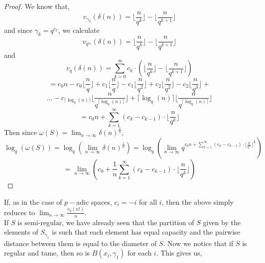 \begin{proof}
	We know that,
\[v_{\gamma_k}(\delta(n)) =  \lfloor\frac{n}{q^k}\rfloor - \lfloor\frac{n}{q^{k+1}}\rfloor \]
and since $\gamma_k = q^{c_k}$, we calculate
\[v_{q^{c_k}}(\delta(n)) =  \lfloor\frac{n}{q^k}\rfloor - \lfloor\frac{n}{q^{k+1}}\rfloor \]
and
\[v_{q}(\delta(n)) =  \sum_{k=0}^{\infty} c_k \cdot(\lfloor\frac{n}{q^k}\rfloor - \lfloor\frac{n}{q^{k+1}}\rfloor) \]
\[=  c_0n - c_0\lfloor\frac{n}{q}\rfloor + c_1\lfloor\frac{n}{q}\rfloor - c_1\lfloor\frac{n}{q^{2}}\rfloor  + c_2\lfloor\frac{n}{q^2}\rfloor - c_2\lfloor\frac{n}{q^{3}}\rfloor +\] \[\ldots - c_{\lceil \log_q(n) \rceil} \lfloor\frac{n}{q^{\lceil \log_q(n) \rceil}}\rfloor + \lceil \log_q(n) \rceil\lfloor\frac{n}{q^{\lceil \log_q(n) \rceil}}\rfloor  \]
\[=  c_0n + \sum_{k=1}^{\infty} (c_{k} - c_{k-1}) \cdot \lfloor\frac{n}{q^{k}}\rfloor \]
Then since $\omega(S) = \lim_{n\to\infty} \delta(n) ^{\frac{1}{n}}$,
\[\log_q(\omega(S)) = \log_q(\lim_{n\to\infty} \delta(n) ^{\frac{1}{n}}) = \log_q(\lim_{n\to\infty}q^{{c_0n + \sum_{k=1}^{\infty} (c_{k} - c_{k-1}) \cdot \lfloor\frac{n}{q^{k}}\rfloor}^{\frac{1}{n}}})\]
 \[=\lim_{n\to\infty} (c_0 + \frac{1}{n}\sum_{k=1}^{\infty} (c_{k} - c_{k-1}) \cdot \lfloor\frac{n}{q^{k}}\rfloor) \] 
\end{proof}

If, as in the case of $p-$adic spaces, $c_i=-i$ for all $i$, then the above simply reduces to $\lim_{n\to\infty} \frac{v_q(n!)}{n}$.\\ %

If $S$ is semi-regular, we have already seen that the partition of $S$ given by the elements of $S_{\gamma_1}$ is such that each element has equal capacity and the pairwise distance between them is equal to the diameter of $S$. Now we notice that if $S$ is regular and tame, then so is $B(x_i,\gamma_1)$ for each $i$. This gives us, 

